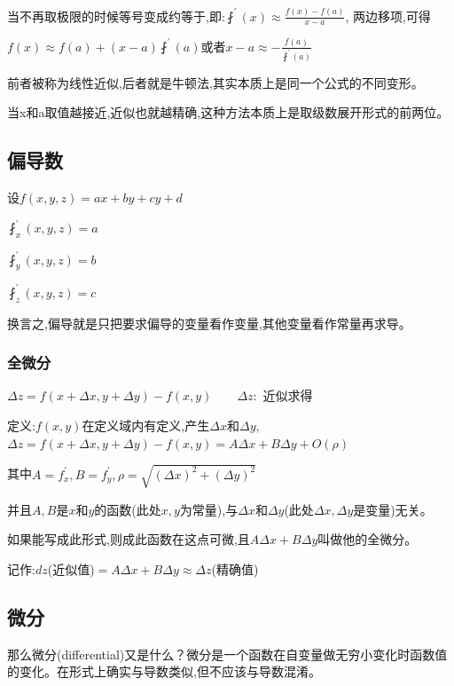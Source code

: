 \documentclass[UTF8]{ctexbook}
\newcommand{\derivative}{^\prime}
\newcommand{\partialDerivative}[1]{^\prime_{#1}}
\newcommand{\fDerivative}[1]{\fint\derivative(#1)}
\newcommand{\defFunction}[1]{f(#1)}
\begin{document}
{{{{    当不再取极限的时候等号变成约等于,即:$\fDerivative{x} \approx \frac{\defFunction{x} - \defFunction{a}}{x - a}$, 两边移项,可得

    $\defFunction{x} \approx \defFunction{a} + (x-a)\fDerivative{a}$或者$x - a \approx -\frac{\defFunction{a}}{\fDerivative{a}}$

    前者被称为线性近似,后者就是牛顿法,其实本质上是同一个公式的不同变形。

    当x和a取值越接近,近似也就越精确,这种方法本质上是取级数展开形式的前两位。

  }%

}%

\subsection{偏导数}{

  设$\defFunction{x,y,z} = ax + by + cy + d$

  $\fint\partialDerivative{x}(x,y,z) = a$

  $\fint\partialDerivative{y}(x,y,z) = b$

  $\fint\partialDerivative{z}(x,y,z) = c$

  换言之,偏导就是只把要求偏导的变量看作变量,其他变量看作常量再求导。

  \subsubsection{全微分}{

    $\Delta z = \defFunction{x + \Delta x,y + \Delta y} - \defFunction{x,y}\qquad\Delta z : $ 近似求得

    定义:$\defFunction{x,y}$在定义域内有定义,产生$\Delta x$和$\Delta y$,$\Delta z = \defFunction{x + \Delta x,y + \Delta y} - \defFunction{x,y} = A\Delta x + B\Delta y + O(\rho)$

    其中$A = f\partialDerivative{x}, B = f\partialDerivative{y}, \rho = \sqrt{(\Delta x)^2 + (\Delta y)^2}$

    并且$A,B$是$x$和$y$的函数(此处$x,y$为常量),与$\Delta x$和$\Delta y$(此处$\Delta x, \Delta y$是变量)无关。

    如果能写成此形式,则成此函数在这点可微,且$A\Delta x + B\Delta y$叫做他的全微分。

    记作:$dz$(近似值)$= A\Delta x + B\Delta y \approx \Delta z$(精确值)

  }

}%

\subsection{微分}{
那么微分(differential)又是什么？微分是一个函数在自变量做无穷小变化时函数值的变化。在形式上确实与导数类似,但不应该与导数混淆。

}}}
\end{document}
